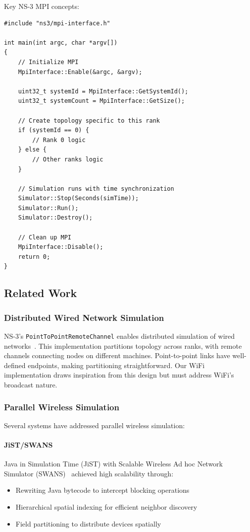 Key NS-3 MPI concepts:

\begin{lstlisting}[style=cpp, caption={NS-3 MPI initialization example}]
#include "ns3/mpi-interface.h"

int main(int argc, char *argv[])
{
    // Initialize MPI
    MpiInterface::Enable(&argc, &argv);
    
    uint32_t systemId = MpiInterface::GetSystemId();
    uint32_t systemCount = MpiInterface::GetSize();
    
    // Create topology specific to this rank
    if (systemId == 0) {
        // Rank 0 logic
    } else {
        // Other ranks logic
    }
    
    // Simulation runs with time synchronization
    Simulator::Stop(Seconds(simTime));
    Simulator::Run();
    Simulator::Destroy();
    
    // Clean up MPI
    MpiInterface::Disable();
    return 0;
}
\end{lstlisting}

\subsection{Related Work}

\subsubsection{Distributed Wired Network Simulation}

NS-3's \texttt{PointToPointRemoteChannel} enables distributed simulation of wired networks~\cite{ns3-mpi}. This implementation partitions topology across ranks, with remote channels connecting nodes on different machines. Point-to-point links have well-defined endpoints, making partitioning straightforward. Our WiFi implementation draws inspiration from this design but must address WiFi's broadcast nature.

\subsubsection{Parallel Wireless Simulation}

Several systems have addressed parallel wireless simulation:

\paragraph{JiST/SWANS}
Java in Simulation Time (JiST) with Scalable Wireless Ad hoc Network Simulator (SWANS)~\cite{barr-jist} achieved high scalability through:
\begin{itemize}
    \item Rewriting Java bytecode to intercept blocking operations
    \item Hierarchical spatial indexing for efficient neighbor discovery  
    \item Field partitioning to distribute devices spatially
\end{itemize}

